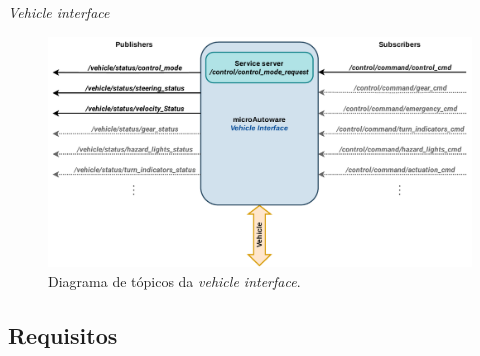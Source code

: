 \documentclass{if-beamer}
\begin{document}
\begin{frame}{\textit{Vehicle interface}}

\begin{figure}
	\centering
	\includegraphics[width=0.9\linewidth]{img/vehicle_interface-topics}
	\caption{Diagrama de tópicos da \textit{vehicle interface}.}
	\label{fig:vehicleinterface-topics}
\end{figure}

\end{frame}


\subsection*{Requisitos}
\end{document}
